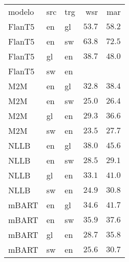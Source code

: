 \begin{tabular}{lllrr}
modelo & src & trg & wsr & mar \\
FlanT5 & en & gl & $53.7$ & $58.2$ \\
FlanT5 & en & sw & $63.8$ & $72.5$ \\
FlanT5 & gl & en & $38.7$ & $48.0$ \\
FlanT5 & sw & en &  &  \\
M2M & en & gl & $32.8$ & $38.4$ \\
M2M & en & sw & $25.0$ & $26.4$ \\
M2M & gl & en & $29.3$ & $36.6$ \\
M2M & sw & en & $23.5$ & $27.7$ \\
NLLB & en & gl & $38.0$ & $45.6$ \\
NLLB & en & sw & $28.5$ & $29.1$ \\
NLLB & gl & en & $33.1$ & $41.0$ \\
NLLB & sw & en & $24.9$ & $30.8$ \\
mBART & en & gl & $34.6$ & $41.7$ \\
mBART & en & sw & $35.9$ & $37.6$ \\
mBART & gl & en & $28.7$ & $35.8$ \\
mBART & sw & en & $25.6$ & $30.7$ \\
\end{tabular}
